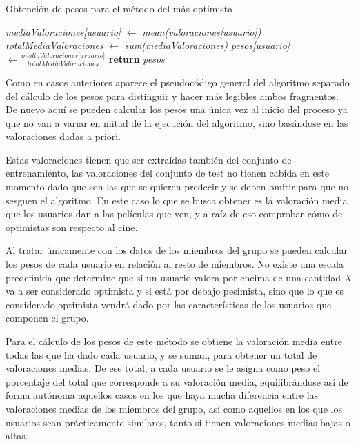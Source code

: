 \begin{algorithm}
	\caption{Obtención de pesos para el método del más optimista}
	\begin{algorithmic}[1]
		\State \textit{mediaValoraciones[usuario]} $\gets$ \textit{mean(valoraciones[usuario])} 
		\EndFor
		\State \textit{totalMediaValoraciones} $\gets$ \textit{sum(mediaValoraciones)}
		\State \textit{pesos[usuario]} $\gets \frac{\textit{mediaValoraciones[usuario]}}{\textit{totalMediaValoraciones}}$
		\EndFor
		\State \textbf{return} \textit{pesos}
	\end{algorithmic}
\end{algorithm}

Como en casos anteriores aparece el pseudocódigo general del algoritmo separado del cálculo de los pesos para distinguir y hacer más legibles ambos fragmentos. De nuevo aquí se pueden calcular los pesos una única vez al inicio del proceso ya que no van a variar en mitad de la ejecución del algoritmo, sino basándose en las valoraciones dadas a priori.

Estas valoraciones tienen que ser extraídas también del conjunto de entrenamiento, las valoraciones del conjunto de test no tienen cabida en este momento dado que son las que se quieren predecir y se deben omitir para que no sesguen el algoritmo. En este caso lo que se busca obtener es la valoración media que los usuarios dan a las películas que ven, y a raíz de eso comprobar cómo de optimistas son respecto al cine.

Al tratar únicamente con los datos de los miembros del grupo se pueden calcular los pesos de cada usuario en relación al resto de miembros. No existe una escala predefinida que determine que si un usuario valora por encima de una cantidad \textit{X} va a ser considerado optimista y si está por debajo pesimista, sino que lo que es considerado optimista vendrá dado por las características de los usuarios que componen el grupo.

Para el cálculo de los pesos de este método se obtiene la valoración media entre todas las que ha dado cada usuario, y se suman, para obtener un total de valoraciones medias. De ese total, a cada usuario se le asigna como peso el porcentaje del total que corresponde a su valoración media, equilibrándose así de forma autónoma aquellos casos en los que haya mucha diferencia entre las valoraciones medias de los miembros del grupo, así como aquellos en los que los usuarios sean prácticamente similares, tanto si tienen valoraciones medias bajas o altas.

